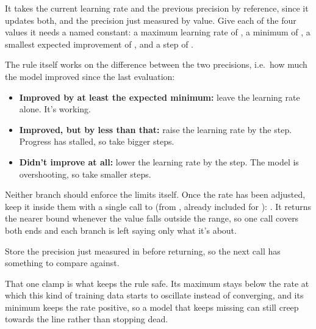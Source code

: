 \noindent It takes the current learning rate and the previous precision by reference, since it
updates both, and the precision just measured by value. Give each of the four values it needs a
named constant: a maximum learning rate of , a minimum of , a smallest
expected improvement of , and a step of .

The rule itself works on the difference between the two precisions, i.e.\ how much the model
improved since the last evaluation:
\begin{itemize}
  \item \textbf{Improved by at least the expected minimum:} leave the learning rate alone. It's
    working.
  \item \textbf{Improved, but by less than that:} raise the learning rate by the step. Progress has
    stalled, so take bigger steps.
  \item \textbf{Didn't improve at all:} lower the learning rate by the step. The model is
    overshooting, so take smaller steps.
\end{itemize}
Neither branch should enforce the limits itself. Once the rate has been adjusted, keep it inside
them with a single call to  (from , already included for
):
. It returns the
nearer bound whenever the value falls outside the range, so one call covers both ends and each
branch is left saying only what it's about.

Store the precision just measured in  before returning, so the next call has
something to compare against.

That one clamp is what keeps the rule safe. Its maximum stays below the rate at which this kind of
training data starts to oscillate instead of converging, and its minimum keeps the rate positive, so
a model that keeps missing can still creep towards the line rather than stopping dead.

